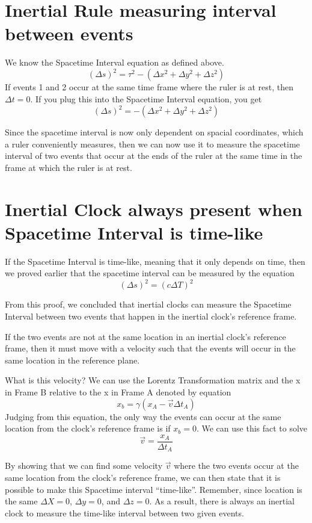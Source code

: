 \documentclass{article}
\begin{document}
\section{Inertial Rule measuring interval between events}
We know the Spacetime Interval equation as defined above.
\[
  (\Delta s)^2 = \tau^2 - (\Delta x^2 + \Delta y^2 + \Delta z^2)
\]
If events 1 and 2 occur at the same time frame where the ruler is at rest, then \(\Delta t = 0\). If you plug this into the Spacetime Interval equation, you get
\[
  (\Delta s)^2 = -(\Delta x^2 + \Delta y^2 + \Delta z^2)
\]

Since the spacetime interval is now only dependent on spacial coordinates, which a ruler conveniently measures, then we can now use it to measure the spacetime interval of two events that occur at the ends of the ruler at the same time in the frame at which the ruler is at rest.

\newpage
\section{Inertial Clock always present when Spacetime Interval is time-like}
If the Spacetime Interval is time-like, meaning that it only depends on time, then we proved earlier that the spacetime interval can be measured by the equation
\[
  (\Delta s)^2 = (c\Delta T)^2
\]

From this proof, we concluded that inertial clocks can measure the Spacetime Interval between two events that happen in the inertial clock's reference frame.

If the two events are not at the same location in an inertial clock's reference frame, then it must move with a velocity such that the events will occur in the same location in the reference plane.

What is this velocity? We can use the Lorentz Transformation matrix and the x in Frame B relative to the x in Frame A denoted by equation
\[
  x_b = \gamma (x_A - \vec{v} \Delta t_A)
\]
Judging from this equation, the only way the events can occur at the same location from the clock's reference frame is if \(x_b = 0\). We can use this fact to solve
\[
  \vec{v} = \frac{x_A}{\Delta t_A}
\]

By showing that we can find some velocity \(\vec{v}\) where the two events occur at the same location from the clock's reference frame, we can then state that it is possible to make this Spacetime interval ``time-like''. Remember, since location is the same \(\Delta X = 0\), \(\Delta y = 0\), and \(\Delta z = 0\). As a result, there is always an inertial clock to measure the time-like interval between two given events.
\newpage
\end{document}
